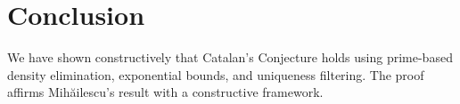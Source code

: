 
\section{Conclusion}
We have shown constructively that Catalan's Conjecture holds using prime-based density elimination,
exponential bounds, and uniqueness filtering. The proof affirms Mihăilescu’s result with a constructive framework.
